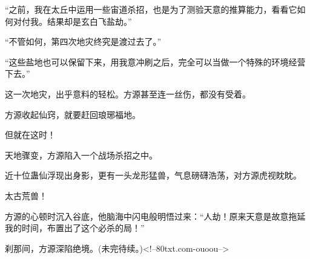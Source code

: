 \begin{this_body}
“之前，我在太丘中运用一些宙道杀招，也是为了测验天意的推算能力，看看它如何对付我。结果却是玄白飞盐劫。”

“不管如何，第四次地灾终究是渡过去了。”

“这些盐地也可以保留下来，用我意冲刷之后，完全可以当做一个特殊的环境经营下去。”

这一次地灾，出乎意料的轻松。方源甚至连一丝伤，都没有受着。

方源收起仙窍，就要赶回琅琊福地。

但就在这时！

天地骤变，方源陷入一个战场杀招之中。

近十位蛊仙浮现出身影，更有一头龙形猛兽，气息磅礴浩荡，对方源虎视眈眈。

太古荒兽！

方源的心顿时沉入谷底，他脑海中闪电般明悟过来：“人劫！原来天意是故意拖延我的时间，布置出了这个必杀的局！”

刹那间，方源深陷绝境。(未完待续。)<!--80txt.com-ouoou-->

\end{this_body}

